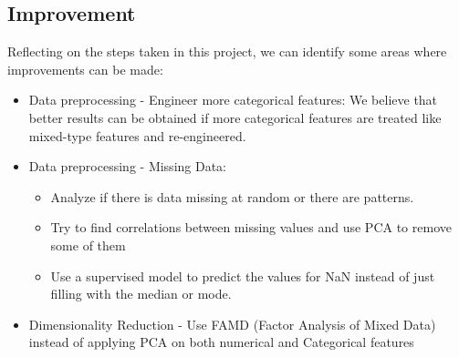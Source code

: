 \subsection{Improvement}

Reflecting on the steps taken in this project, we can identify some areas where improvements can be made:
\begin{itemize}
    \item Data preprocessing - Engineer more categorical features: We believe that better results can be obtained if more categorical features are treated like mixed-type features and re-engineered.
    \item Data preprocessing - Missing Data: 
        \begin{itemize}
            \item Analyze if there is data missing at random or there are patterns. 
            \item Try to find correlations between missing values and use PCA to remove some of them
            \item Use a supervised model to predict the values for NaN instead of just filling with the median or mode.
        \end{itemize}
    \item Dimensionality Reduction - Use FAMD (Factor Analysis of Mixed Data) instead of applying PCA on both numerical and Categorical features
\end{itemize}
